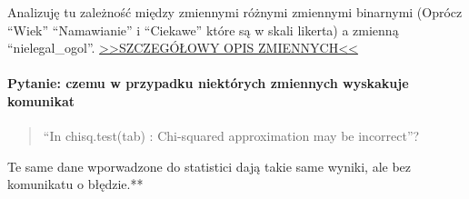 \documentclass[]{article}
\let\oldparagraph\paragraph
\renewcommand{\paragraph}[1]{\oldparagraph{#1}\mbox{}}
\begin{document}
Analizuję tu zależność między zmiennymi różnymi zmiennymi binarnymi
(Oprócz ``Wiek'' ``Namawianie'' i ``Ciekawe'' które są w skali likerta)
a zmienną ``nielegal\_ogol''.
\href{http://htmlpreview.github.io/?https://github.com/zdanowski/Ankieta_substancje_psychoaktywne/blob/master/OPIS_ZMIENNYCH.html}{\textgreater{}\textgreater{}SZCZEGÓŁOWY
OPIS ZMIENNYCH\textless{}\textless{}}

\paragraph{\texorpdfstring{\textbf{Pytanie}: czemu w przypadku
niektórych zmiennych wyskakuje
komunikat}{Pytanie: czemu w przypadku niektórych zmiennych wyskakuje komunikat}}\label{pytanie-czemu-w-przypadku-niektorych-zmiennych-wyskakuje-komunikat}

\begin{quote}
``In chisq.test(tab) : Chi-squared approximation may be incorrect''?
\end{quote}

Te same dane wporwadzone do statistici dają takie same wyniki, ale bez
komunikatu o błędzie.**
\end{document}
